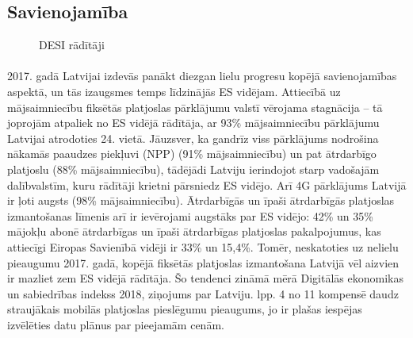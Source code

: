 \subsection{Savienojamība}
\begin{figure}[h]
    \label{att:desi_savienojamiba}
    \caption{DESI rādītāji}
\end{figure}
\paragraph{}
2017. gadā Latvijai izdevās panākt diezgan lielu progresu kopējā savienojamības
aspektā, un tās izaugsmes temps līdzinājās ES vidējam. Attiecībā uz mājsaimniecību
fiksētās platjoslas pārklājumu valstī vērojama stagnācija – tā joprojām atpaliek no ES
vidējā rādītāja, ar 93\% mājsaimniecību pārklājumu Latvijai atrodoties 24. vietā.
Jāuzsver, ka gandrīz viss pārklājums nodrošina nākamās paaudzes piekļuvi (NPP)
(91\% mājsaimniecību) un pat ātrdarbīgo platjoslu (88\% mājsaimniecību), tādējādi
Latviju ierindojot starp vadošajām dalībvalstīm, kuru rādītāji krietni pārsniedz ES
vidējo. Arī 4G pārklājums Latvijā ir ļoti augsts (98\% mājsaimniecību). Ātrdarbīgās un
īpaši ātrdarbīgās platjoslas izmantošanas līmenis arī ir ievērojami augstāks par ES
vidējo: 42\% un 35\% mājokļu abonē ātrdarbīgas un īpaši ātrdarbīgas platjoslas
pakalpojumus, kas attiecīgi Eiropas Savienībā vidēji ir 33\% un 15,4\%. Tomēr,
neskatoties uz nelielu pieaugumu 2017. gadā, kopējā fiksētās platjoslas izmantošana
Latvijā vēl aizvien ir mazliet zem ES vidējā rādītāja. Šo tendenci zināmā mērā 
Digitālās ekonomikas un sabiedrības indekss 2018, ziņojums par Latviju. lpp. 4 no 11
kompensē daudz straujākais mobilās platjoslas pieslēgumu pieaugums, jo ir plašas
iespējas izvēlēties datu plānus par pieejamām cenām.
